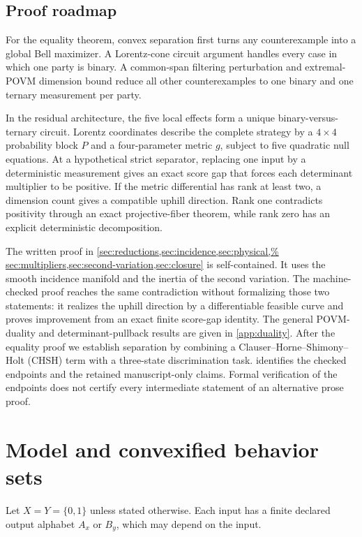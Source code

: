 \documentclass[11pt]{article}
\theoremstyle{definition}
\begin{document}
\subsection*{Proof roadmap}

For the equality theorem, convex separation first turns
any counterexample into a global Bell maximizer. A Lorentz-cone circuit
argument handles every case in which one party is binary. A common-span
filtering perturbation and extremal-POVM dimension bound reduce all other
counterexamples to one binary and one ternary measurement per party.

In the residual architecture, the five local effects form a unique
binary-versus-ternary circuit. Lorentz coordinates describe the complete
strategy by a \(4\times4\) probability block \(P\) and a four-parameter
metric \(g\), subject to five quadratic null equations. At a hypothetical
strict separator, replacing one input by a deterministic measurement gives
an exact score gap that forces each determinant multiplier to be positive.
If the metric differential has rank at least two, a dimension count gives a
compatible uphill direction. Rank one contradicts positivity through
an exact projective-fiber theorem, while rank zero has an explicit
deterministic decomposition.

The written proof in \cref{sec:reductions,sec:incidence,sec:physical,%
sec:multipliers,sec:second-variation,sec:closure} is self-contained. It
uses the smooth incidence manifold and the inertia of the second variation.
The machine-checked proof reaches the same contradiction without
formalizing those two statements: it realizes the uphill direction by a
differentiable feasible curve and proves improvement from an exact finite
score-gap identity. The general
POVM-duality and determinant-pullback results are given in \cref{app:duality}.
After the equality proof we establish separation by combining a
Clauser--Horne--Shimony--Holt (CHSH) term \cite{clauser1969} with a
three-state discrimination task.
 identifies the checked endpoints and the retained
manuscript-only claims. Formal verification of the endpoints does not
certify every intermediate statement of an alternative prose proof.

\section{Model and convexified behavior sets}
\label{sec:model}

Let \(X=Y=\{0,1\}\) unless stated otherwise. Each input has a finite declared
output alphabet \(A_x\) or \(B_y\), which may depend on the input.
\end{document}
